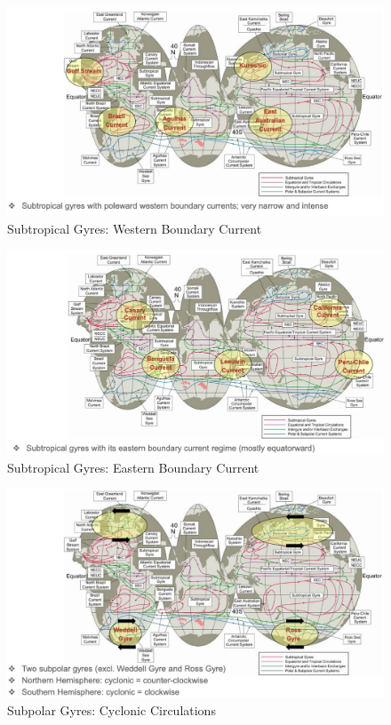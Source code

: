 \documentclass[fontsize=8pt, a4paper, landscape, fleqn]{scrartcl}
\begin{document}
\begin{multicols*}{3}[\raggedcolumns]
\begin{figure}[H]
    \centering
    \includegraphics[width=0.9\linewidth]{CS//img/western_bound.png}
    \caption{Subtropical Gyres: Western Boundary Current}
\end{figure}

\begin{figure}[H]
    \centering
    \includegraphics[width=0.9\linewidth]{CS//img/eastern_bound.png}
    \caption{Subtropical Gyres: Eastern Boundary Current}
\end{figure}

\begin{figure}[H]
    \centering
    \includegraphics[width=1\linewidth]{CS//img/cyclonic_circulations.png}
    \caption{Subpolar Gyres: Cyclonic Circulations}
\end{figure}


\end{multicols*}
\end{document}
